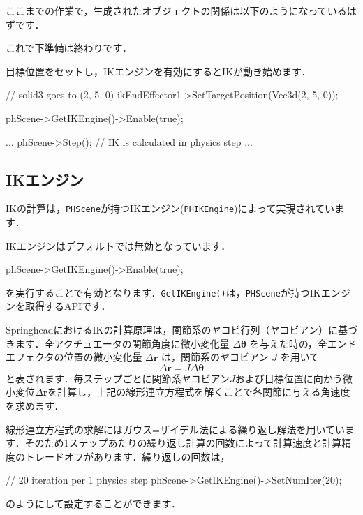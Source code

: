 \KLUDGE ここまでの作業で，生成されたオブジェクトの関係は以下のようになっているはずです．
\begin{center}
\end{center}
\KLUDGE これで下準備は終わりです．

\KLUDGE 目標位置をセットし，IK\KLUDGE エンジンを有効にするとIK\KLUDGE が動き始めます．
\begin{sourcecode}
// solid3 goes to (2, 5, 0)
ikEndEffector1->SetTargetPosition(Vec3d(2, 5, 0)); 

phScene->GetIKEngine()->Enable(true);

...
phScene->Step(); // IK is calculated in physics step
...
\end{sourcecode}

%
% 

\subsection*{IK\KLUDGE エンジン}

IK\KLUDGE の計算は，\texttt{PHScene}\KLUDGE が持つIK\KLUDGE エンジン(\texttt{PHIKEngine})\KLUDGE によって実現されています．

IK\KLUDGE エンジンはデフォルトでは無効となっています．
\begin{sourcecode}
phScene->GetIKEngine()->Enable(true);
\end{sourcecode}
\KLUDGE を実行することで有効となります．\texttt{GetIKEngine()}\KLUDGE は，\texttt{PHScene}\KLUDGE が持つIK\KLUDGE エンジンを取得するAPI\KLUDGE です．

Springhead\KLUDGE におけるIK\KLUDGE の計算原理は，関節系のヤコビ行列（ヤコビアン）に基づきます．全アクチュエータの関節角度に微小変化量 $\varDelta\bm{\theta}$ \KLUDGE を与えた時の，全エンドエフェクタの位置の微小変化量 $\varDelta\bm{r}$ \KLUDGE は，関節系のヤコビアン $J$ \KLUDGE を用いて
\[
\varDelta\bm{r} = J \varDelta\bm{\theta}
\]
\KLUDGE と表されます．毎ステップごとに関節系ヤコビアン$J$\KLUDGE および目標位置に向かう微小変位$\varDelta\bm{r}$\KLUDGE を計算し，上記の線形連立方程式を解くことで各関節に与える角速度を求めます．

\KLUDGE 線形連立方程式の求解にはガウス=\KLUDGE ザイデル法による繰り返し解法を用いています．そのため1\KLUDGE ステップあたりの繰り返し計算の回数によって計算速度と計算精度のトレードオフがあります．繰り返しの回数は，
\begin{sourcecode}
// 20 iteration per 1 physics step
phScene->GetIKEngine()->SetNumIter(20);
\end{sourcecode}
\KLUDGE のようにして設定することができます．

